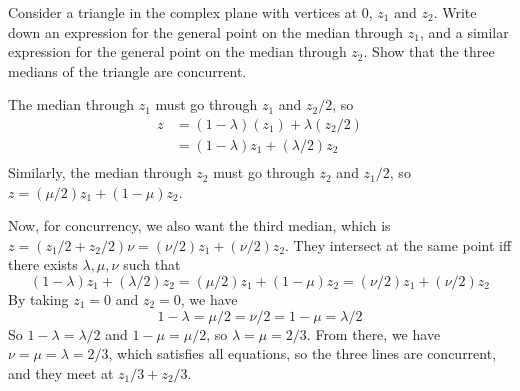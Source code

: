 \documentclass[12pt]{article}
\begin{document}
    \begin{question}
        Consider a triangle in the complex plane with vertices at $0$, $z_{1}$ and $z_{2}$.
        Write down an expression for the general point on the median through $z_{1}$,
        and a similar expression for the general point on the median through $z_{2}$.
        Show that the three medians of the triangle are concurrent.
    \end{question}
    \begin{answer}
        The median through $z_{1}$ must go through $z_{1}$ and $z_{2}/2$, so
        \begin{align*}
            z 
            &= (1-\lambda)(z_{1})+\lambda(z_{2}/2)\\
            &= (1-\lambda)z_{1}+(\lambda/2)z_{2}\\
        \end{align*}
        Similarly, the median through $z_{2}$ must go through $z_{2}$ and $z_{1}/2$,
        so $z = (\mu/2)z_{1}+(1-\mu)z_{2}$.

        Now, for concurrency, we also want the third median,
        which is $z = (z_{1}/2 + z_{2}/2)\nu = (\nu/2)z_{1} + (\nu/2)z_{2}$.
        They intersect at the same point iff there
        exists $\lambda,\mu,\nu$ such that
        \[
            (1-\lambda)z_{1}+(\lambda/2)z_{2} 
            = (\mu/2)z_{1}+(1-\mu)z_{2}
            = (\nu/2)z_{1} + (\nu/2)z_{2}
        \]
        By taking $z_{1}=0$ and $z_{2}=0$, we have
        \[
            1-\lambda = \mu/2 = \nu/2 = 1-\mu = \lambda/2
        \]
        So $1-\lambda = \lambda/2$ and $1-\mu=\mu/2$, so $\lambda=\mu=2/3$.
        From there, we have $\nu=\mu=\lambda=2/3$,
        which satisfies all equations, so the three lines are concurrent,
        and they meet at $z_{1}/3 + z_{2}/3$.
    \end{answer}
\end{document}
